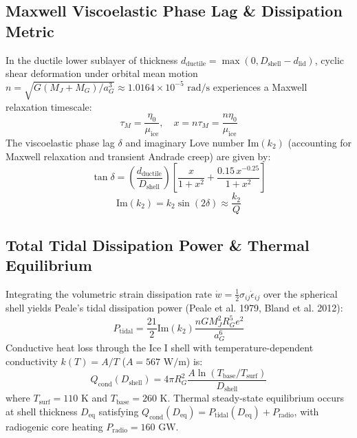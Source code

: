 \documentclass[11pt,a4paper]{article}
\begin{document}
\subsection{Maxwell Viscoelastic Phase Lag \& Dissipation Metric}
In the ductile lower sublayer of thickness $d_{\text{ductile}} = \max(0, D_{\text{shell}} - d_{\text{lid}})$, cyclic shear deformation under orbital mean motion $n = \sqrt{G(M_J + M_G)/a_G^3} \approx 1.0164 \times 10^{-5}\text{ rad/s}$ experiences a Maxwell relaxation timescale:
\begin{equation}
\tau_M = \frac{\eta_0}{\mu_{\text{ice}}}, \quad x = n \tau_M = \frac{n \eta_0}{\mu_{\text{ice}}}
\end{equation}
The viscoelastic phase lag $\delta$ and imaginary Love number $\text{Im}(k_2)$ (accounting for Maxwell relaxation and transient Andrade creep) are given by:
\begin{equation}
\tan \delta = \left(\frac{d_{\text{ductile}}}{D_{\text{shell}}}\right) \left[ \frac{x}{1 + x^2} + \frac{0.15 \, x^{-0.25}}{1 + x^2} \right]
\end{equation}
\begin{equation}
\text{Im}(k_2) = k_2 \sin(2\delta) \approx \frac{k_2}{Q}
\end{equation}

\subsection{Total Tidal Dissipation Power \& Thermal Equilibrium}
Integrating the volumetric strain dissipation rate $\dot{w} = \frac{1}{2} \sigma_{ij} \dot{\epsilon}_{ij}$ over the spherical shell yields Peale's tidal dissipation power (Peale et al. 1979, Bland et al. 2012):
\begin{equation}
P_{\text{tidal}} = \frac{21}{2} \text{Im}(k_2) \frac{n G M_J^2 R_G^5 e^2}{a_G^6}
\end{equation}
Conductive heat loss through the Ice I shell with temperature-dependent conductivity $k(T) = A / T$ ($A = 567\text{ W/m}$) is:
\begin{equation}
Q_{\text{cond}}(D_{\text{shell}}) = 4\pi R_G^2 \frac{A \ln(T_{\text{base}} / T_{\text{surf}})}{D_{\text{shell}}}
\end{equation}
where $T_{\text{surf}} = 110\text{ K}$ and $T_{\text{base}} = 260\text{ K}$. Thermal steady-state equilibrium occurs at shell thickness $D_{\text{eq}}$ satisfying $Q_{\text{cond}}(D_{\text{eq}}) = P_{\text{tidal}}(D_{\text{eq}}) + P_{\text{radio}}$, with radiogenic core heating $P_{\text{radio}} = 160\text{ GW}$.
\end{document}
